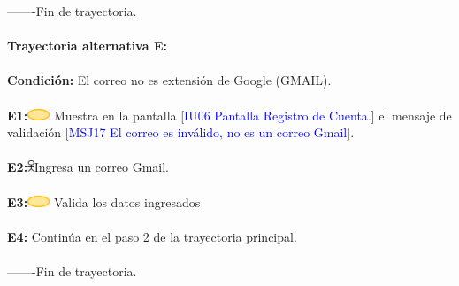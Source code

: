         -------Fin de  trayectoria. \\\\

                    \textbf{Trayectoria alternativa E:}\\\\
                        \textbf{Condición: }El correo no es extensión de Google (GMAIL).\\\\
                        
                        \textbf{E1:}\includegraphics[width=0.0500\textwidth]{Figuras/sistema.png} Muestra en la pantalla [\textcolor{blue}{IU06 Pantalla Registro de Cuenta}.] el mensaje de validación [\textcolor{blue}{MSJ17 El correo es inválido, no es un correo Gmail}].  \\\\  
                        \textbf{E2:}\includegraphics[width=0.0150\textwidth]{Figuras/persona.png}Ingresa un correo Gmail.\\\\
                        \textbf{E3:}\includegraphics[width=0.0500\textwidth]{Figuras/sistema.png} Valida los datos ingresados\\\\
                        \textbf{E4:} Continúa en el paso 2 de la trayectoria principal. \\\\
       
        -------Fin de  trayectoria. \\\\

